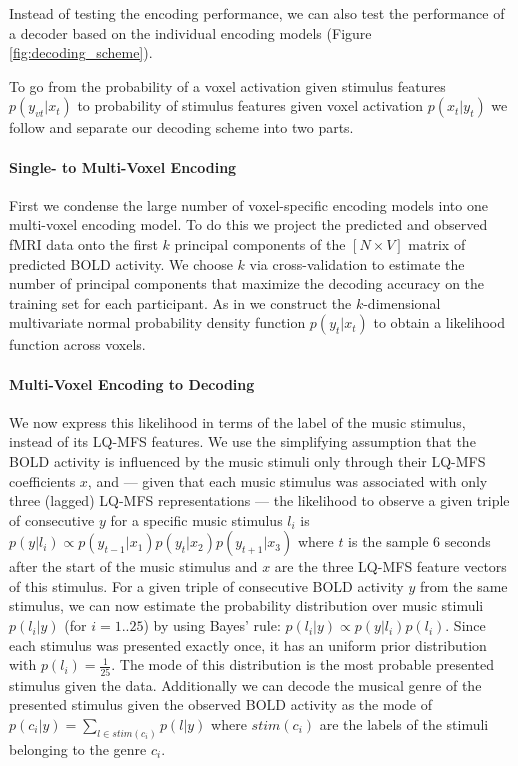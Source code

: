 Instead of testing the encoding performance, we can also test the performance
of a decoder based on the individual encoding models \citep{NG11} (Figure
\ref{fig:decoding_scheme}).

To go from the probability of a voxel activation
given stimulus features $p(y_{vt}|x_{t})$ to probability of stimulus features
given voxel activation $p(x_{t}|y_{t})$ we follow \citet{NG09} and separate our
decoding scheme into two parts. 

\paragraph{Single- to Multi-Voxel Encoding}

First we condense the large number of voxel-specific encoding models into one
multi-voxel encoding model.  To do this we project the predicted and observed
f{MRI} data onto the first $k$ principal components of the $[N\times V]$ matrix
of predicted BOLD activity. We choose $k$ via cross-validation to estimate the
number of principal components that maximize the decoding accuracy on the
training set for each participant.
As in \citet{NG09} we construct the $k$-dimensional multivariate normal
probability density function $p(y_{t}|x_{t})$ to obtain a likelihood function
across voxels. 

\paragraph{Multi-Voxel Encoding to Decoding}

We now express this likelihood in terms of the label of the music stimulus, instead of its LQ-MFS features.  We
use the simplifying assumption that the BOLD activity is influenced by the
music stimuli only through their LQ-MFS coefficients $x$, and --- given that
each music stimulus was associated with only three (lagged) LQ-MFS
representations --- the likelihood to observe a given triple of consecutive $y$
for a specific music stimulus $l_{i}$ is $p(y|l_{i}) \propto
p(y_{t-1}|x_{1})p(y_{t}|x_{2})p(y_{t+1}|x_{3})$ where $t$ is the sample 6
seconds after the start of the music stimulus and $x$ are the three LQ-MFS
feature vectors of this stimulus.  For a given triple of consecutive BOLD
activity $y$ from the same stimulus, we can now estimate the probability
distribution over music stimuli $p(l_{i}|y)$ (for $i=1..25$) by using Bayes'
rule: $p(l_{i}|y) \propto p(y|l_{i})p(l_{i})$.
Since each stimulus was presented exactly once,
it has an uniform prior distribution with $p(l_{i})=\frac{1}{25}$. The mode of
this distribution is the most probable presented stimulus given the data. 
Additionally we can decode the musical genre of the presented stimulus given the observed
BOLD activity as the mode of $p(c_{i}|y) = \sum\nolimits_{l \in
  stim(c_{i})} p(l|y)$ where $stim(c_{i})$ are the labels of the stimuli
  belonging to the genre $c_{i}$. 


